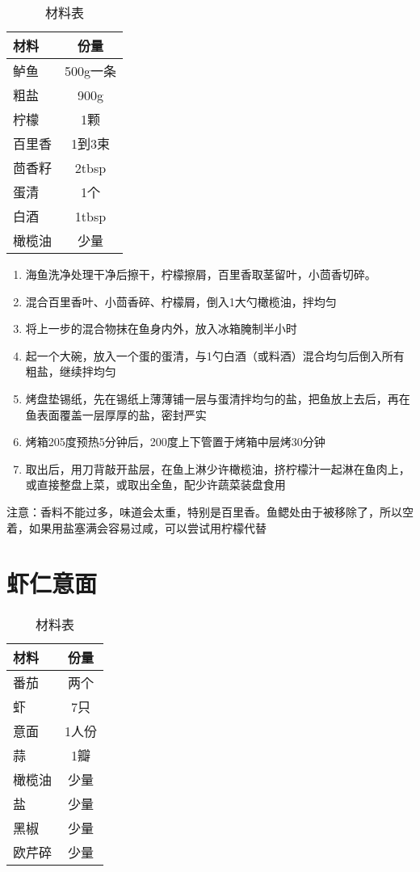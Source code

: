 \begin{table}[H]
    \centering
    \begin{tabular}{|l||c|}\hline
     \textbf{材料}    &  \textbf{份量}\\ \hline\hline
    鲈鱼 & 500g一条 \\ \hline
    粗盐 & 900g  \\ \hline
    柠檬 & 1颗  \\ \hline
    百里香 &  1到3束 \\ \hline
    茴香籽 & 2tbsp \\ \hline
    蛋清 & 1个 \\ \hline
    白酒 & 1tbsp \\ \hline
    橄榄油 &  少量 \\ \hline
    \end{tabular}
    \caption{材料表}
\end{table}

\begin{enumerate}
    \item 海鱼洗净处理干净后擦干，柠檬擦屑，百里香取茎留叶，小茴香切碎。
    \item 混合百里香叶、小茴香碎、柠檬屑，倒入1大勺橄榄油，拌均匀
    \item 将上一步的混合物抹在鱼身内外，放入冰箱腌制半小时
    \item 起一个大碗，放入一个蛋的蛋清，与1勺白酒（或料酒）混合均匀后倒入所有粗盐，继续拌均匀
    \item 烤盘垫锡纸，先在锡纸上薄薄铺一层与蛋清拌均匀的盐，把鱼放上去后，再在鱼表面覆盖一层厚厚的盐，密封严实
    \item 烤箱205度预热5分钟后，200度上下管置于烤箱中层烤30分钟
    \item 取出后，用刀背敲开盐层，在鱼上淋少许橄榄油，挤柠檬汁一起淋在鱼肉上，或直接整盘上菜，或取出全鱼，配少许蔬菜装盘食用
\end{enumerate}

注意：香料不能过多，味道会太重，特别是百里香。鱼鳃处由于被移除了，所以空着，如果用盐塞满会容易过咸，可以尝试用柠檬代替

\section{虾仁意面}

\begin{table}[H]
    \centering
    \begin{tabular}{|l||c|}\hline
     \textbf{材料}    &  \textbf{份量}\\ \hline\hline
    番茄 & 两个 \\ \hline
    虾 & 7只  \\ \hline
    意面 & 1人份  \\ \hline
    蒜 &  1瓣 \\ \hline
    橄榄油 & 少量\\ \hline
    盐 & 少量 \\ \hline
    黑椒 &  少量 \\ \hline
    欧芹碎 &  少量 \\ \hline
    \end{tabular}
    \caption{材料表}
\end{table}

